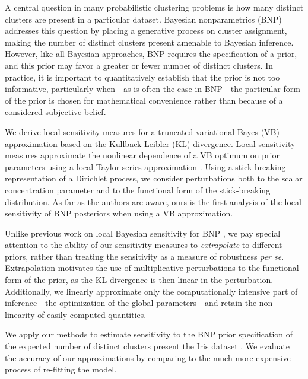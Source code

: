 
A central question in many probabilistic clustering problems is how many
distinct clusters are present in a particular dataset. Bayesian nonparametrics
(BNP) addresses this question by placing a generative process on cluster
assignment, making the number of distinct clusters present amenable to Bayesian
inference.  However, like all Bayesian approaches, BNP requires the
specification of a prior, and this prior may favor a greater or fewer number of
distinct clusters. In practice, it is important to quantitatively establish that
the prior is not too informative, particularly when---as is often the case in
BNP---the particular form of the prior is chosen for mathematical convenience
rather than because of a considered subjective belief.

We derive local sensitivity measures for a truncated variational Bayes (VB)
approximation based on the Kullback-Leibler (KL) divergence. Local sensitivity
measures approximate the nonlinear dependence of a VB optimum on prior
parameters using a local Taylor series approximation
\citep{gustafson:1996:localposterior, giordano:2017:covariances}. Using a
stick-breaking representation of a Dirichlet process, we consider perturbations
both to the scalar concentration parameter and to the functional form of the
stick-breaking distribution. As far as the authors are aware, ours is the first
analysis of the local sensitivity of BNP posteriors when using a VB
approximation.

Unlike previous work on local Bayesian sensitivity for BNP
\citep{Basu:2000:BNP_robustness}, we pay special attention to the ability of our
sensitivity measures to \emph{extrapolate} to different priors, rather than
treating the sensitivity as a measure of robustness \textit{per se}.
Extrapolation motivates the use of multiplicative perturbations to the
functional form of the prior, as the KL divergence is then linear in the
perturbation. Additionally, we linearly approximate only the computationally
intensive part of inference---the optimization of the global parameters---and
retain the non-linearity of easily computed quantities.

We apply our methods to estimate sensitivity to the BNP prior specification of
the expected number of distinct clusters present the Iris dataset
\citep{iris_data_anderson, iris_data_fisher}.  We evaluate the accuracy of our
approximations by comparing to the much more expensive process of re-fitting the
model.
